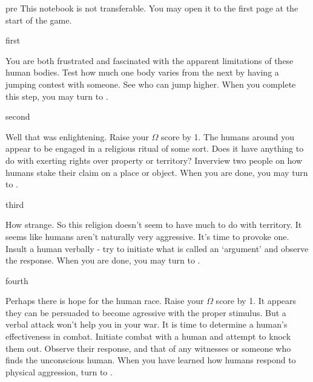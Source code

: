 \documentclass[notebook]{guildcamp1}
\begin{document}

\startnotebook{\nAlienAgression{}}

\begin{page}{pre}
This notebook is not transferable. You may open it to the first page at the start of the game.
\end{page}

\begin{page}{first}

You are both frustrated and fascinated with the apparent limitations of these human bodies.  Test how much one body varies from the next by having a jumping contest with someone. See who can jump higher. When you complete this step, you may turn to .

\end{page}

\begin{page}{second}

Well that was enlightening. Raise your $\Omega$ score by 1.  The humans around you appear to be engaged in a religious ritual of some sort. Does it have anything to do with exerting rights over property or territory? Inverview two people on how humans stake their claim on a place or object. When you are done, you may turn to .

\end{page}

\begin{page}{third}

How strange. So this religion doesn't seem to have much to do with territory. It seems like humans aren't naturally very aggressive. It's time to provoke one. Insult a human verbally - try to initiate what is called an `argument' and observe the response. When you are done, you may turn to .

\end{page}

\begin{page}{fourth}

Perhaps there is hope for the human race.  Raise your $\Omega$ score by 1. It appears they can be persuaded to become agressive with the proper stimulus. But a verbal attack won't help you in your war. It is time to determine a human's effectiveness in combat.  Initiate combat with a  human and attempt to knock them out. Observe their response, and that of any witnesses or someone who finds the unconscious human. When you have learned how humans respond to physical aggression, turn to .

\end{page}
\end{document}
